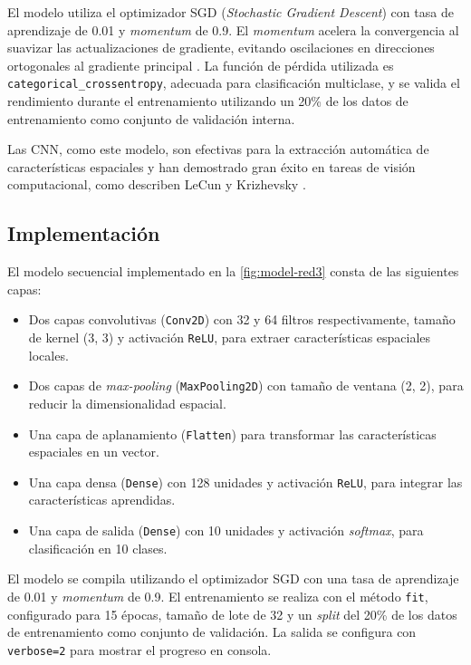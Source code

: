 El modelo utiliza el optimizador SGD (\textit{Stochastic Gradient Descent}) con tasa de aprendizaje de 0.01 y \textit{momentum} de 0.9. El \textit{momentum} acelera la convergencia al suavizar las actualizaciones de gradiente, evitando oscilaciones en direcciones ortogonales al gradiente principal \parencite{sutskever2013momentum}. La función de pérdida utilizada es \texttt{categorical\_crossentropy}, adecuada para clasificación multiclase, y se valida el rendimiento durante el entrenamiento utilizando un 20\% de los datos de entrenamiento como conjunto de validación interna.

Las CNN, como este modelo, son efectivas para la extracción automática de características espaciales y han demostrado gran éxito en tareas de visión computacional, como describen LeCun \parencite{lecun1998gradient} y Krizhevsky \parencite{krizhevsky2012imagenet}.

\subsection{Implementación}


El modelo secuencial implementado en la \autoref{fig:model-red3} consta de las siguientes capas:
\begin{itemize}
	\item Dos capas convolutivas (\texttt{Conv2D}) con 32 y 64 filtros respectivamente, tamaño de kernel (3, 3) y activación \texttt{ReLU}, para extraer características espaciales locales.
	\item Dos capas de \textit{max-pooling} (\texttt{MaxPooling2D}) con tamaño de ventana (2, 2), para reducir la dimensionalidad espacial.
	\item Una capa de aplanamiento (\texttt{Flatten}) para transformar las características espaciales en un vector.
	\item Una capa densa (\texttt{Dense}) con 128 unidades y activación \texttt{ReLU}, para integrar las características aprendidas.
	\item Una capa de salida (\texttt{Dense}) con 10 unidades y activación \textit{softmax}, para clasificación en 10 clases.
\end{itemize}

El modelo se compila utilizando el optimizador SGD con una tasa de aprendizaje de 0.01 y \textit{momentum} de 0.9. El entrenamiento se realiza con el método \texttt{fit}, configurado para 15 épocas, tamaño de lote de 32 y un \textit{split} del 20\% de los datos de entrenamiento como conjunto de validación. La salida se configura con \texttt{verbose=2} para mostrar el progreso en consola.

